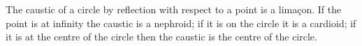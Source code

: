 The caustic of a circle by reflection with respect to a
point is a lima\c{c}on. If the point is at infinity the caustic
is a nephroid; if it is on the circle it is a cardioid; if it is
at the centre of the circle then the caustic is the centre of the circle.